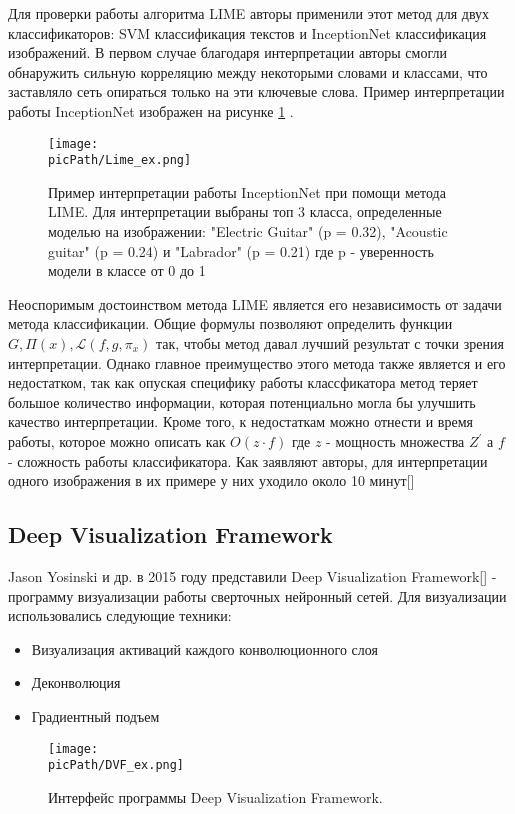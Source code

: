\documentclass[oneside,final,14pt]{extreport}
\newcommand{\picPath}{img}
\begin{document}
Для проверки работы алгоритма LIME авторы применили этот метод для двух классификаторов: SVM классификация текстов и InceptionNet  классификация изображений. В первом случае благодаря интерпретации авторы смогли обнаружить сильную корреляцию между некоторыми словами и классами, что заставляло сеть опираться только на эти ключевые слова. Пример интерпретации работы InceptionNet изображен на рисунке \ref{pic:LIME} .

\begin{figure}[H]
\begin{center}
\texttt{[image: \\picPath/Lime\_ex.png]}
\end{center}
  \caption{Пример интерпретации работы InceptionNet при помощи метода LIME. Для интерпретации выбраны топ 3 класса, определенные моделью на изображении: "Electric Guitar" (p = 0.32), "Acoustic guitar" (p = 0.24)  и "Labrador" (p = 0.21) где p - уверенность модели в классе от 0 до 1}
  \label{pic:LIME}
\end{figure}

Неоспоримым достоинством метода LIME является его независимость от задачи метода классификации. Общие формулы позволяют определить функции $G, \Pi(x), \mathcal{L}(f,g,\pi_x)$ так, чтобы метод давал лучший результат с точки зрения интерпретации. Однако главное преимущество этого метода также является и его недостатком, так как опуская специфику работы классфикатора метод теряет большое количество информации, которая потенциально могла бы улучшить качество интерпретации. Кроме того, к недостаткам можно отнести и время работы, которое можно описать как $O(z\cdot f)$ где $z$ - мощность множества $Z^\prime$ а $f$  - сложность работы классификатора. Как заявляют авторы, для интерпретации одного изображения в их примере у них уходило около 10 минут[] 

\subsection{Deep Visualization Framework}
Jason Yosinski и др. в 2015 году представили Deep Visualization Framework[] - программу визуализации работы сверточных нейронный сетей. Для визуализации использовались следующие техники: 
\begin{itemize}
\item Визуализация активаций каждого конволюционного слоя
\item Деконволюция
\item Градиентный подъем
\end{itemize}
\begin{figure}[H]
\begin{center}
\texttt{[image: \\picPath/DVF\_ex.png]}
\end{center}
  \caption{Интерфейс программы Deep Visualization Framework.}
  \label{pic:DVF}
\end{figure}
\end{document}
